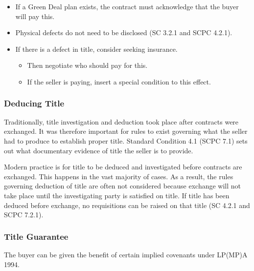 \documentclass[
]{article}
\providecommand{\tightlist}{%
  \setlength{\itemsep}{0pt}\setlength{\parskip}{0pt}}
\begin{document}
\begin{itemize}
\tightlist
\item
  If a Green Deal plan exists, the contract must acknowledge that the
  buyer will pay this.
\item
  Physical defects do not need to be disclosed (SC 3.2.1 and SCPC
  4.2.1).
\item
  If there is a defect in title, consider seeking insurance.

  \begin{itemize}
  \tightlist
  \item
    Then negotiate who should pay for this.
  \item
    If the seller is paying, insert a special condition to this effect.
  \end{itemize}
\end{itemize}

\hypertarget{deducing-title}{%
\subsubsection{Deducing Title}\label{deducing-title}}

Traditionally, title investigation and deduction took place after
contracts were exchanged. It was therefore important for rules to exist
governing what the seller had to produce to establish proper title.
Standard Condition 4.1 (SCPC 7.1) sets out what documentary evidence of
title the seller is to provide.

Modern practice is for title to be deduced and investigated before
contracts are exchanged. This happens in the vast majority of cases. As
a result, the rules governing deduction of title are often not
considered because exchange will not take place until the investigating
party is satisfied on title. If title has been deduced before exchange,
no requisitions can be raised on that title (SC 4.2.1 and SCPC 7.2.1).

\hypertarget{title-guarantee}{%
\subsubsection{Title Guarantee}\label{title-guarantee}}

The buyer can be given the benefit of certain implied covenants under
LP(MP)A 1994.
\end{document}
